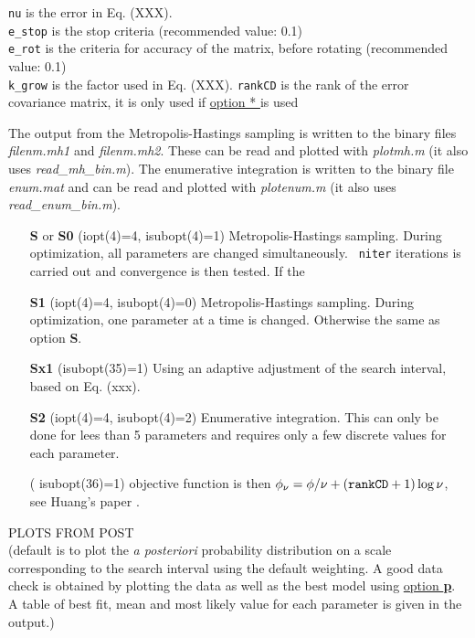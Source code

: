 \documentclass{saclantc}
\begin{document}
{\tt nu} is the error in Eq. (XXX). \\
 {\tt e\_stop} is the stop criteria (recommended value: 0.1) \\
{\tt e\_rot} is the  criteria for accuracy of the matrix, before rotating 
(recommended value: 0.1)\\
{\tt  k\_{grow}} is the factor used in  Eq. (XXX).
{\tt  rankCD} is the rank of the error covariance matrix, it is only used if  \underline{option * } is used
 
The output from the Metropolis-Hastings sampling is written to the binary files
{\it filenm.mh1}
and  {\it filenm.mh2}. These can be read and plotted with
{\it plotmh.m}
(it also uses {\it read\_mh\_bin.m}). The enumerative integration is
  written to the binary file {\it enum.mat} and can be read and plotted with
{\it plotenum.m}
(it also uses {\it read\_enum\_bin.m}).

\vspace{-0.6cm}
\begin{itemize}
    \item[{\bf S} or {\bf S0} ] (iopt(4)=4, isubopt(4)=1) Metropolis-Hastings sampling. 
   During
    optimization, all parameters are changed simultaneously. {\tt
   niter} iterations is carried out and convergence is then tested.
   If the  
    \item[{\bf S1}] (iopt(4)=4, isubopt(4)=0) Metropolis-Hastings sampling.   During
    optimization, one parameter at a time is changed. Otherwise the
    same as option {\bf S}.
\item[{\bf Sx1}]   (isubopt(35)=1) Using an adaptive adjustment of the
  search interval, based on Eq. (xxx).
\item[{\bf S2}] (iopt(4)=4, isubopt(4)=2) Enumerative integration.  This can only be done for lees than 5 parameters and requires only a few discrete values for each parameter.
\item[{\bf *}] ( isubopt(36)=1) objective function is then $ \phi_\nu=\phi/\nu+({\tt rankCD}+1)\log \nu$, see Huang's paper  \cite{huang06a}.
\end{itemize}
    
\noindent PLOTS FROM {\sf POST} \\
(default is to plot the {\it a posteriori} probability distribution on a
 scale corresponding to the search interval using the default weighting. 
 A good data check is obtained by plotting the data as well as the
best model using \underline{option {\bf p}}.
 A table of best fit, mean and most
likely value for each parameter is given in the output.)
\end{document}
